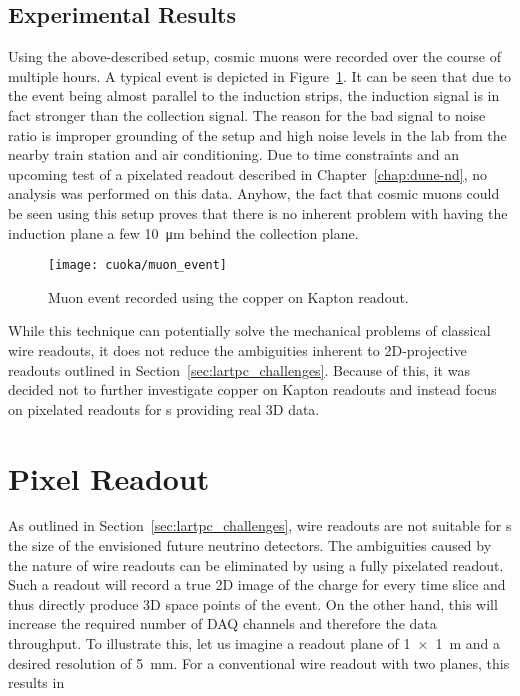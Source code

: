 \subsection*{Experimental Results}

Using the above-described setup, cosmic muons were recorded over the course of multiple hours.
A typical event is depicted in Figure~\ref{fig:cuoka_event}.
It can be seen that due to the event being almost parallel to the induction strips, the induction signal is in fact stronger than the collection signal.
The reason for the bad signal to noise ratio is improper grounding of the setup and high noise levels in the lab from the nearby train station and air conditioning.
Due to time constraints and an upcoming test of a pixelated readout described in Chapter~\ref{chap:dune-nd}, no analysis was performed on this data.
Anyhow, the fact that cosmic muons could be seen using this setup proves that there is no inherent problem with having the induction plane a few \SI{10}{\micro\metre} behind the collection plane.

\begin{figure}[htb]
	\centering
	\texttt{[image: cuoka/muon\_event]}
	\caption{Muon event recorded using the copper on Kapton readout.}
	\label{fig:cuoka_event}
\end{figure}

While this technique can potentially solve the mechanical problems of classical wire readouts, it does not reduce the ambiguities inherent to 2D-projective readouts outlined in Section~\ref{sec:lartpc_challenges}.
Because of this, it was decided not to further investigate copper on Kapton readouts and instead focus on pixelated readouts for \lartpc{}s providing real 3D data.


\section{Pixel Readout}
\label{sec:charge-ro_pixels}

As outlined in Section~\ref{sec:lartpc_challenges}, wire readouts are not suitable for \lartpc{}s the size of the envisioned future neutrino detectors.
The ambiguities caused by the nature of wire readouts can be eliminated by using a fully pixelated readout.
Such a readout will record a true 2D image of the charge for every time slice and thus directly produce 3D space points of the event.
On the other hand, this will increase the required number of DAQ channels and therefore the data throughput.
To illustrate this, let us imagine a readout plane of \SI{1 x 1}{\metre} and a desired resolution of \SI{5}{\milli\metre}.
For a conventional wire readout with two planes, this results in

